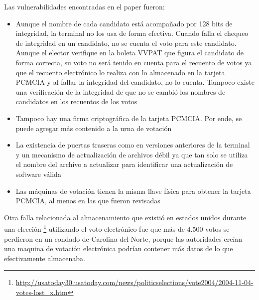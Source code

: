 Las vulnerabilidades encontradas en el paper fueron:
\begin{itemize}
	\item Aunque el nombre de cada candidato está acompañado por 128 bits de integridad, la terminal no los usa de forma efectiva. Cuando falla el chequeo de integridad en un candidato, no se cuenta el voto para este candidato. Aunque el elector verifique en la boleta VVPAT que figura el candidato de forma correcta, su voto no será tenido en cuenta para el recuento de votos ya que el recuento electrónico lo realiza con lo almacenado en la tarjeta PCMCIA y al fallar la integridad del candidato, no lo cuenta. Tampoco existe una verificación de la integridad de que no se cambió los nombres de candidatos en los recuentos de los votos
	\item Tampoco hay una firma criptográfica de la tarjeta PCMCIA. Por ende, se puede agregar más contenido a la urna de votación
	\item La existencia de puertas traseras como en versiones anteriores de la terminal y un mecanismo de actualización de archivos débil ya que tan solo se utiliza el nombre del archivo a actualizar para identificar una actualización de software válida
	\item Las máquinas de votación tienen la misma llave física para obtener la tarjeta PCMCIA, al menos en las que fueron revisadas
\end{itemize}

Otra falla relacionada al almacenamiento que existió en estados unidos durante una elección 
\footnote{\url{http://usatoday30.usatoday.com/news/politicselections/vote2004/2004-11-04-votes-lost_x.htm}}
 utilizando el voto electrónico fue que más de 4.500 votos se perdieron en un condado de Carolina del Norte, porque las autoridades creían una maquina de votación electrónica podrían contener más datos de lo que efectivamente almacenaba.

